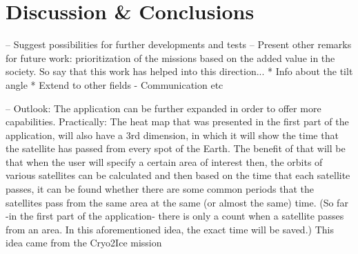 \chapter{Discussion \& Conclusions}
\label{chap:5}

--  Suggest possibilities for further developments and tests
--  Present other remarks for future work: prioritization of the missions based on the added value in the society. So say that this work has helped into this direction...
* Info about the tilt angle
* Extend to other fields - Communication etc

-- Outlook:
The application can be further expanded in order to offer more capabilities. Practically: The heat map that was presented in the first part of the application, will also have a 3rd dimension, in which it will show the time that the satellite has passed from every spot of the Earth. The benefit of that will be that when the user will specify a certain area of interest then, the orbits of various satellites can be calculated and then based on the time that each satellite passes, it can be found whether there are some common periods that the satellites pass from the same area at the same (or almost the same) time. 
(So far -in the first part of the application- there is only a count when a satellite passes from an area. In this aforementioned idea, the exact time will be saved.)
This idea came from the Cryo2Ice mission %